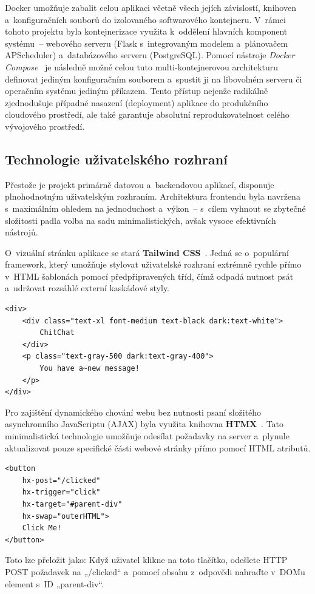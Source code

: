 \documentclass[a4paper]{article}
\begin{document}
Docker umožňuje zabalit celou aplikaci včetně všech jejích závislostí, knihoven a~konfiguračních souborů do izolovaného softwarového kontejneru. V~rámci tohoto projektu byla kontejnerizace využita k~oddělení hlavních komponent systému~-- webového serveru (Flask s~integrovaným modelem a~plánovačem APScheduler) a~databázového serveru (PostgreSQL). Pomocí nástroje \textit{Docker Compose}~\cite{docker-compose} je následně možné celou tuto multi-kontejnerovou architekturu definovat jediným konfiguračním souborem a~spustit ji na libovolném serveru či operačním systému jediným příkazem. Tento přístup nejenže radikálně zjednodušuje případné nasazení (deployment) aplikace do produkčního cloudového prostředí, ale také garantuje absolutní reprodukovatelnost celého vývojového prostředí.

\newpage
\subsection{Technologie uživatelského rozhraní}
Přestože je projekt primárně datovou a~backendovou aplikací, disponuje plnohodnotným uživatelským rozhraním. Architektura frontendu byla navržena s~maximálním ohledem na jednoduchost a~výkon~-- s~cílem vyhnout se zbytečné složitosti padla volba na sadu minimalistických, avšak vysoce efektivních nástrojů.

O~vizuální stránku aplikace se stará \textbf{Tailwind CSS}~\cite{tailwind}. Jedná se o~populární framework, který umožňuje stylovat uživatelské rozhraní extrémně rychle přímo v~HTML šablonách pomocí předpřipravených tříd, čímž odpadá nutnost psát a~udržovat rozsáhlé externí kaskádové styly.
\begin{lstlisting}[style=htmlstyle, caption={Příklad použití Tailwind CSS}]
<div>
    <div class="text-xl font-medium text-black dark:text-white">
        ChitChat
    </div>
    <p class="text-gray-500 dark:text-gray-400">
        You have a~new message!
    </p>
</div>
\end{lstlisting}


Pro zajištění dynamického chování webu bez nutnosti psaní složitého asynchronního JavaScriptu (AJAX) byla využita knihovna \textbf{HTMX}~\cite{htmx}. Tato minimalistická technologie umožňuje odesílat požadavky na server a~plynule aktualizovat pouze specifické části webové stránky přímo pomocí HTML atributů.
\begin{lstlisting}[style=htmlstyle, caption={Příklad použití HTMX}]
<button 
    hx-post="/clicked"
    hx-trigger="click"
    hx-target="#parent-div"
    hx-swap="outerHTML">
    Click Me!
</button>
\end{lstlisting}
Toto lze přeložit jako:
Když uživatel klikne na toto tlačítko, odešlete HTTP POST požadavek na „/clicked“ a~pomocí obsahu z~odpovědi nahraďte v~DOMu element s~ID „parent-div“.
\end{document}
